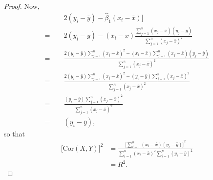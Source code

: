 \begin{proof}
    Now,
    \begin{equation*}
        \begin{split}
            \qquad &2(y_i - \bar{y}) - \hat{\beta}_1(x_i - \bar{x})] \\
            = \, &2(y_i - \bar{y}) - (x_i - \bar{x})
                \frac{\sum_{j=1}^{n}(x_j - \bar{x})(y_j - \bar{y})}
                {\sum_{j=1}^{n}{(x_j - \bar{x})}^{2}} \\
            = \, &\frac{2(y_i - \bar{y})\sum_{j=1}^{n}{(x_j - \bar{x})}^{2} 
                - (x_i - \bar{x})\sum_{j=1}^{n}(x_j - \bar{x})(y_j - \bar{y})}
                {\sum_{j=1}^{n}{(x_j - \bar{x})}^{2}} \\
            = \, &\frac{2(y_i - \bar{y})\sum_{j=1}^{n}{(x_j - \bar{x})}^{2} 
                - (y_i - \bar{y})\sum_{j=1}^{n}{(x_j - \bar{x})}^{2}}
                {\sum_{j=1}^{n}{(x_j - \bar{x})}^{2}} \\
            = \, &\frac{(y_i - \bar{y})\sum_{j=1}^{n}{(x_j - \bar{x})}^{2}} 
                {\sum_{j=1}^{n}{(x_j - \bar{x})}^{2}} \\
            = \, &(y_i - \bar{y}),
        \end{split}
    \end{equation*}
    so that
    \begin{equation*}
        \begin{split}
            {\bigl[\text{Cor}(X, Y)\bigr]}^{2} 
            &= \frac{{\bigl[\sum_{i=1}^{n}(x_i - \bar{x})(y_i - \bar{y})\bigr]}^{2}}
            {\sum_{i=1}^{n}{(x_i - \bar{x})}^{2}\sum_{i=1}^{n}{(y_i - \bar{y})}^{2}} \\
            &= R^2.
        \end{split}
    \end{equation*}
\end{proof}
